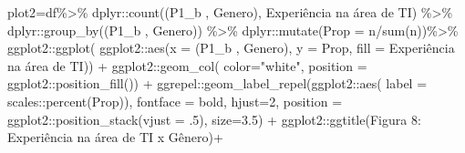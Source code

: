 \documentclass[
]{article}
\newenvironment{Shaded}{\begin{snugshade}}{\end{snugshade}}
\newcommand{\AttributeTok}[1]{\textcolor[rgb]{0.77,0.63,0.00}{#1}}
\newcommand{\DecValTok}[1]{\textcolor[rgb]{0.00,0.00,0.81}{#1}}
\newcommand{\FloatTok}[1]{\textcolor[rgb]{0.00,0.00,0.81}{#1}}
\newcommand{\FunctionTok}[1]{\textcolor[rgb]{0.00,0.00,0.00}{#1}}
\newcommand{\NormalTok}[1]{#1}
\newcommand{\OtherTok}[1]{\textcolor[rgb]{0.56,0.35,0.01}{#1}}
\newcommand{\SpecialCharTok}[1]{\textcolor[rgb]{0.00,0.00,0.00}{#1}}
\newcommand{\StringTok}[1]{\textcolor[rgb]{0.31,0.60,0.02}{#1}}
\begin{document}
\begin{Shaded}
\begin{Highlighting}[]
\NormalTok{plot2}\OtherTok{=}\NormalTok{df}\SpecialCharTok{\%\textgreater{}\%}
\NormalTok{  dplyr}\SpecialCharTok{::}\FunctionTok{count}\NormalTok{(}\StringTok{\textasciigrave{}}\AttributeTok{(\textquotesingle{}P1\_b \textquotesingle{}, \textquotesingle{}Genero\textquotesingle{})}\StringTok{\textasciigrave{}}\NormalTok{, }\StringTok{\textasciigrave{}}\AttributeTok{Experiência na área de TI}\StringTok{\textasciigrave{}}\NormalTok{) }\SpecialCharTok{\%\textgreater{}\%}
\NormalTok{  dplyr}\SpecialCharTok{::}\FunctionTok{group\_by}\NormalTok{(}\StringTok{\textasciigrave{}}\AttributeTok{(\textquotesingle{}P1\_b \textquotesingle{}, \textquotesingle{}Genero\textquotesingle{})}\StringTok{\textasciigrave{}}\NormalTok{) }\SpecialCharTok{\%\textgreater{}\%}
\NormalTok{  dplyr}\SpecialCharTok{::}\FunctionTok{mutate}\NormalTok{(}\AttributeTok{Prop =}\NormalTok{ n}\SpecialCharTok{/}\FunctionTok{sum}\NormalTok{(n))}\SpecialCharTok{\%\textgreater{}\%}
\NormalTok{  ggplot2}\SpecialCharTok{::}\FunctionTok{ggplot}\NormalTok{(}
\NormalTok{    ggplot2}\SpecialCharTok{::}\FunctionTok{aes}\NormalTok{(}\AttributeTok{x =} \StringTok{\textasciigrave{}}\AttributeTok{(\textquotesingle{}P1\_b \textquotesingle{}, \textquotesingle{}Genero\textquotesingle{})}\StringTok{\textasciigrave{}}\NormalTok{, }\AttributeTok{y =}\NormalTok{ Prop,}
                 \AttributeTok{fill =} \StringTok{\textasciigrave{}}\AttributeTok{Experiência na área de TI}\StringTok{\textasciigrave{}}\NormalTok{)) }\SpecialCharTok{+}
\NormalTok{  ggplot2}\SpecialCharTok{::}\FunctionTok{geom\_col}\NormalTok{( }\AttributeTok{color=}\StringTok{"white"}\NormalTok{,}
                     \AttributeTok{position =}\NormalTok{ ggplot2}\SpecialCharTok{::}\FunctionTok{position\_fill}\NormalTok{()) }\SpecialCharTok{+}
\NormalTok{  ggrepel}\SpecialCharTok{::}\FunctionTok{geom\_label\_repel}\NormalTok{(ggplot2}\SpecialCharTok{::}\FunctionTok{aes}\NormalTok{(}
    \AttributeTok{label =}\NormalTok{ scales}\SpecialCharTok{::}\FunctionTok{percent}\NormalTok{(Prop)),}
    \AttributeTok{fontface =} \StringTok{\textquotesingle{}bold\textquotesingle{}}\NormalTok{,}
    \AttributeTok{hjust=}\DecValTok{2}\NormalTok{,}
    \AttributeTok{position =}\NormalTok{ ggplot2}\SpecialCharTok{::}\FunctionTok{position\_stack}\NormalTok{(}\AttributeTok{vjust =}\NormalTok{ .}\DecValTok{5}\NormalTok{),}
    \AttributeTok{size=}\FloatTok{3.5}\NormalTok{) }\SpecialCharTok{+}
\NormalTok{  ggplot2}\SpecialCharTok{::}\FunctionTok{ggtitle}\NormalTok{(}\StringTok{\textquotesingle{}Figura 8: Experiência na área de TI x Gênero\textquotesingle{}}\NormalTok{)}\SpecialCharTok{+}

\end{Highlighting}
\end{Shaded}
\end{document}
